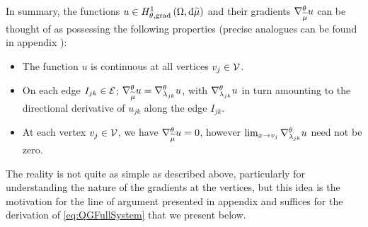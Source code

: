 In summary, the functions $u\in H^1_{\theta, \mathrm{grad}}\left( \Omega, \mathrm{d}\widetilde{\mu} \right)$ and their gradients $\nabla^{\theta}_{\widetilde{\mu}}u$ can be thought of as possessing the following properties (precise analogues can be found in appendix ):
\begin{itemize}
	\item The function $u$ is continuous at all vertices $v_j\in\mathcal{V}$.
	\item On each edge $I_{jk}\in\mathcal{E}$; $\nabla^{\theta}_{\widetilde{\mu}}u = \nabla^{\theta}_{\lambda_{jk}}u$, with $\nabla^{\theta}_{\lambda_{jk}}u$ in turn amounting to the directional derivative of $u_{jk}$ along the edge $I_{jk}$.
	\item At each vertex $v_j\in\mathcal{V}$, we have $\nabla^{\theta}_{\widetilde{\mu}}u=0$, however $\lim_{x\rightarrow v_j}\nabla^{\theta}_{\lambda_{jk}}u$ need not be zero.
\end{itemize}
The reality is not quite as simple as described above, particularly for understanding the nature of the gradients at the vertices, but this idea is the motivation for the line of argument presented in appendix  and suffices for the derivation of \eqref{eq:QGFullSystem} that we present below. \newline

